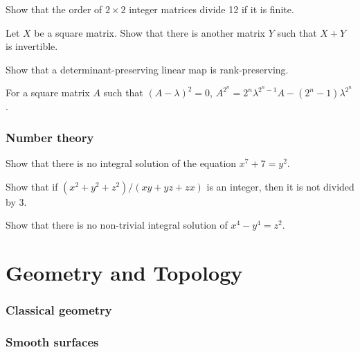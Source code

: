 \documentclass[12pt]{article}
\begin{document}
	\begin{prb}
	Show that the order of $2\times 2$ integer matrices divide 12 if it is finite.
	\end{prb}

	\begin{prb}
	Let $X$ be a square matrix. Show that there is another matrix $Y$ such that $X+Y$ is invertible.
	\end{prb}

	\begin{prb}
	Show that a determinant-preserving linear map is rank-preserving.
	\end{prb}

	\begin{prb}
	For a square matrix $A$ such that $(A-\lambda)^2=0$, $A^{2^n}=2^n\lambda^{2^n-1}A-(2^n-1)\lambda^{2^n}$.
	\end{prb}




\section{Number theory}
	\begin{prb}
	Show that there is no integral solution of the equation $x^7+7=y^2$.
	\end{prb}

	\begin{prb}
	Show that if $(x^2+y^2+z^2)/(xy+yz+zx)$ is an integer, then it is not divided by 3.
	\end{prb}
	
	\begin{prb}
	Show that there is no non-trivial integral solution of $x^4-y^4=z^2$.
	\end{prb}








\newpage
\part{Geometry and Topology}
\setcounter{section}{0}

\section{Classical geometry}

\section{Smooth surfaces}
\end{document}

